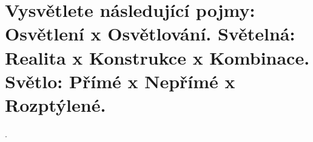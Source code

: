 \section{Vysvětlete následující pojmy: Osvětlení x Osvětlování. Světelná: Realita x Konstrukce x Kombinace. Světlo: 
Přímé x Nepřímé x Rozptýlené.}.